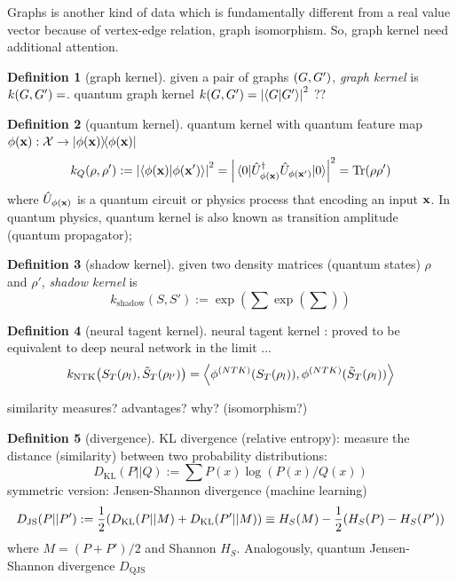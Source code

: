 \documentclass[
10pt,
aps,
pra,
linenumbers,
floatfix,
]{revtex4-2}
\theoremstyle{plain}
\theoremstyle{definition}
\newtheorem{definition}{Definition}
\newcommand{\kernel}{k}
\newcommand{\jsd}{D_\text{JS}}
\newcommand{\kl}{D_\text{KL}}
\newcommand{\shadow}{\text{shadow}}
\newcommand{\U}{\hat{U}}
\newcommand{\dm}{\rho}
\begin{document}
Graphs is another kind of data which is fundamentally different from a real value vector because of vertex-edge relation, graph isomorphism.
So, graph kernel \cite{kriegeSurveyGraphKernels2020} need additional attention.
\begin{definition}[graph kernel]\label{def:graph_kernel}
	given a pair of graphs $(G,G')$,
	\emph{graph kernel} is $\kernel (\graph,\graph')  =$.
	quantum graph kernel $\kernel (\graph,\graph')  = \abs{\ip{\graph}{\graph'}}^2$ ??
	\cite{baiQuantumJensenShannon2015}	
\end{definition}
\begin{definition}[quantum kernel]\label{def:quantum_kernel}
	quantum kernel 
	with quantum feature map $\phi(\vb{x}): \mathcal{X}\to \op{\phi(\vb{x})}$
	\begin{equation}
		k_Q(\rho,\rho') := \abs{\ip{\phi(\vbx)}{\phi(\vbx')}}^2 =\abs{\mel{0}{\U_{\phi(\vbx)}^\dagger \U_{\phi(\vbx')} }{0}}^2 = \Tr(\rho\rho')
	\end{equation}
	where $\U_{\phi(\vbx)}$ is a quantum circuit or physics process that encoding an input $\vb{x}$.
	In quantum physics, quantum kernel is also known as transition amplitude (quantum propagator);
\end{definition}
\begin{definition}[shadow kernel]
	given two density matrices (quantum states) $\rho$ and $\rho'$,
	\emph{shadow kernel} \cite{huangPredictingManyProperties2020} is 
	\begin{equation}
		k_{\shadow}(S,S') := 
		\exp(\sum\exp(\sum))
	\end{equation}	
\end{definition}
\begin{definition}[neural tagent kernel]
	neural tagent kernel \cite{jacotNeuralTangentKernel2020}: proved to be equivalent to deep neural network \cite{gaoEfficientRepresentationQuantum2017} in the limit ...
	\begin{equation}
		k_{\text{NTK}} \qty(S_T(\dm_l),\tilde{S}_T(\dm_{l'}))
		=
		\expval{
			\phi^{(NTK)}(S_T(\dm_l)),
			\phi^{(NTK)}(\tilde{S}_T(\dm_l))
		}
	\end{equation}
\end{definition}
similarity measures? advantages? why? (isomorphism?)
\begin{definition}[divergence]\label{def:divergence}
	KL divergence (relative entropy): measure the distance (similarity) between two probability distributions:
	\begin{equation}
		\kl (P || Q) := \sum P(x) \log (P(x)/Q(x))
	\end{equation}
	symmetric version: Jensen-Shannon divergence (machine learning)
	\begin{equation}
		\jsd (P || P') := \frac{1}{2} \qty(\kl(P|| M) + \kl(P'||M))
		\equiv H_S(M)-\frac{1}{2} (H_S(P) - H_S(P') ) 
	\end{equation}
	where $M=(P+P')/2$ and Shannon  $H_S$.
	Analogously, quantum Jensen-Shannon divergence $D_{\text{QJS}}$
\end{definition}
\end{document}
